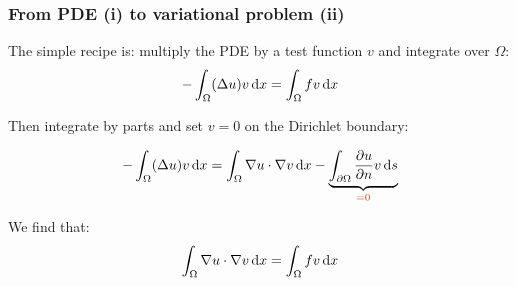 \begin{frame}
  \frametitle{From PDE (i) to variational problem (ii)}

  The simple recipe is: multiply the PDE by a test function $v$ and
  integrate over $\Omega$:
  \begin{equation*}
    -\int_\Omega (\Delta u)v \, \mathrm{d}x = \int_\Omega fv\, \mathrm{d}x
  \end{equation*}

  Then integrate by parts and set $v = 0$ on the Dirichlet boundary:

  \begin{equation*}
    -\int_\Omega (\Delta u) v \dx
    = \int_\Omega \nabla u\cdot\nabla v\dx -
   \underbrace{\int_{\partial\Omega} \frac{\partial u}{\partial n} v\ds}_{\textcolor{fenicsred}{=0}}
  \end{equation*}

  We find that:
  \begin{equation*}
    \int_\Omega\nabla u\cdot\nabla v\, \mathrm{d}x = \int_\Omega fv\, \mathrm{d}x
  \end{equation*}

\end{frame}
